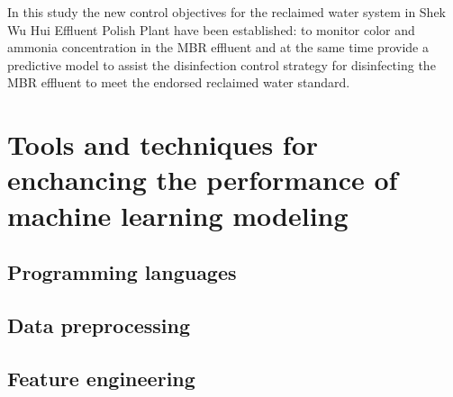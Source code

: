In this study the new control objectives for the reclaimed water system in 
Shek Wu Hui Effluent Polish Plant have been established: to monitor color 
and ammonia concentration in the MBR effluent and at the same time provide 
a predictive model to assist the disinfection control strategy for disinfecting 
the MBR effluent to meet the endorsed reclaimed water standard.


\section{Tools and techniques for enchancing the performance of machine learning modeling}
\subsection{Programming languages}
\subsection{Data preprocessing}

\subsection{Feature engineering}

